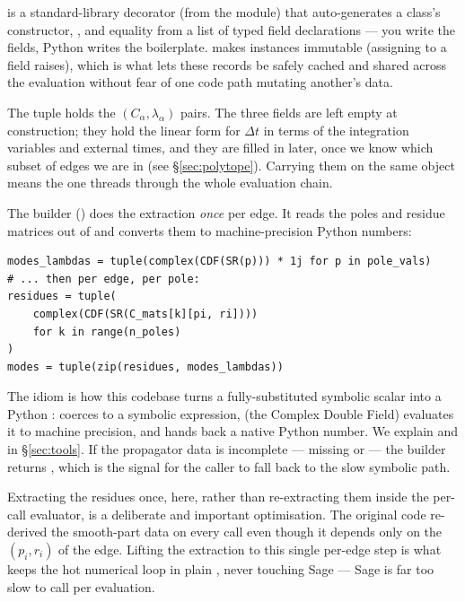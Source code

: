 \begin{note}
 is a standard-library decorator (from the 
module) that auto-generates a class's constructor, , and
equality from a list of typed field declarations --- you write the fields, Python
writes the boilerplate.  makes instances immutable (assigning
to a field raises), which is what lets these records be safely cached and shared
across the evaluation without fear of one code path mutating another's data.
\end{note}

The  tuple holds the $(C_\alpha, \lambda_\alpha)$ pairs. The three
 fields are left empty at construction; they hold the linear form for
$\Delta t$ in terms of the integration variables and external times, and they
are filled in later, once we know which subset of edges we are in (see
\S\ref{sec:polytope}). Carrying them on the same object means the one
 threads through the whole evaluation chain.

The builder 
() does the extraction \emph{once} per edge. It
reads the poles and residue matrices out of  and converts
them to machine-precision Python  numbers:

\begin{lstlisting}
modes_lambdas = tuple(complex(CDF(SR(p))) * 1j for p in pole_vals)
# ... then per edge, per pole:
residues = tuple(
    complex(CDF(SR(C_mats[k][pi, ri])))
    for k in range(n_poles)
)
modes = tuple(zip(residues, modes_lambdas))
\end{lstlisting}

\noindent The idiom  is how this codebase turns a
fully-substituted symbolic scalar into a Python :  coerces
to a symbolic expression,  (the Complex Double Field) evaluates it to
machine precision, and  hands back a native Python number. We
explain  and  in \S\ref{sec:tools}. If the propagator data is
incomplete --- missing  or  --- the builder returns
, which is the signal for the caller to fall back to the slow
symbolic path.

\begin{gotcha}
Extracting the residues once, here, rather than re-extracting them inside the
per-call evaluator, is a deliberate and important optimisation. The original
code re-derived the smooth-part data on every  call even
though it depends only on the $(p_i, r_i)$ of the edge. Lifting the extraction to
this single per-edge step is what keeps the hot numerical loop in plain
, never touching Sage --- Sage is far too slow to call per
evaluation.
\end{gotcha}

